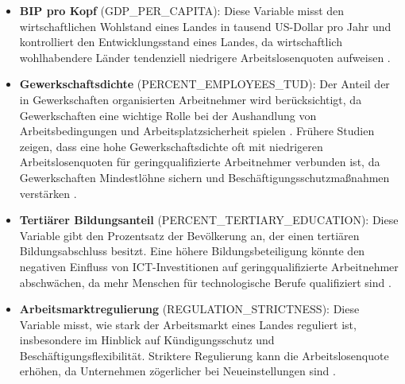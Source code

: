 \begin{itemize}
    \item \textbf{\ac{BIP} pro Kopf} (GDP\_PER\_CAPITA): Diese Variable misst den 
    wirtschaftlichen Wohlstand eines Landes in tausend US-Dollar pro Jahr und kontrolliert 
    den Entwicklungsstand eines Landes, da wirtschaftlich wohlhabendere Länder tendenziell 
    niedrigere Arbeitslosenquoten aufweisen \parencite{oecd2022gdp}.

    \item \textbf{Gewerkschaftsdichte} (PERCENT\_EMPLOYEES\_TUD): Der Anteil der in 
    Gewerkschaften organisierten Arbeitnehmer wird berücksichtigt, da Gewerkschaften eine 
    wichtige Rolle bei der Aushandlung von Arbeitsbedingungen und Arbeitsplatzsicherheit 
    spielen \parencite{oecd2022tud}. Frühere Studien zeigen, dass eine hohe Gewerkschaftsdichte 
    oft mit niedrigeren Arbeitslosenquoten für geringqualifizierte Arbeitnehmer verbunden ist, 
    da Gewerkschaften Mindestlöhne sichern und Beschäftigungsschutzmaßnahmen verstärken 
    \parencite[S. 61]{nickell1997unemployment}.

    \item \textbf{Tertiärer Bildungsanteil} (PERCENT\_TERTIARY\_EDUCATION): Diese 
    Variable gibt den Prozentsatz der Bevölkerung an, der einen tertiären Bildungsabschluss 
    besitzt. Eine höhere Bildungsbeteiligung könnte den negativen Einfluss von 
    \ac{ICT}-Investitionen auf geringqualifizierte Arbeitnehmer abschwächen, da mehr Menschen 
    für technologische Berufe qualifiziert sind \parencite{oecd2022education}.

    \item \textbf{Arbeitsmarktregulierung} (REGULATION\_STRICTNESS): Diese 
    Variable misst, wie stark der Arbeitsmarkt eines Landes reguliert ist, insbesondere im 
    Hinblick auf Kündigungsschutz und Beschäftigungsflexibilität. Striktere Regulierung kann 
    die Arbeitslosenquote erhöhen, da Unternehmen zögerlicher bei Neueinstellungen sind 
    \parencite{oecd2022regulation}.


\end{itemize}
